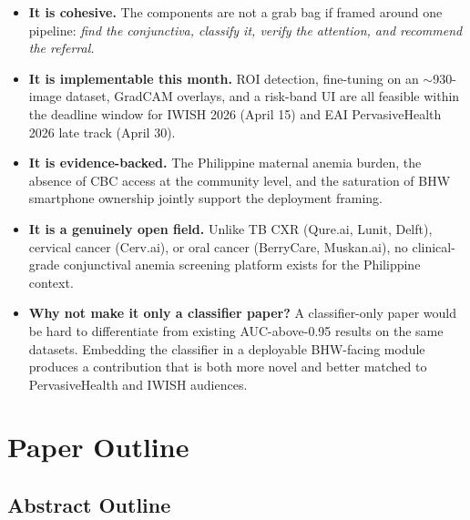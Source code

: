 \documentclass[11pt]{article}
\begin{document}
    \begin{itemize}[leftmargin=1.5em]
        \item \textbf{It is cohesive.} The components are not a grab bag if framed around one pipeline: \emph{find the conjunctiva, classify it, verify the attention, and recommend the referral.}
        \item \textbf{It is implementable this month.} ROI detection, fine-tuning on an $\sim$930-image dataset, GradCAM overlays, and a risk-band UI are all feasible within the deadline window for IWISH 2026 (April 15) and EAI PervasiveHealth 2026 late track (April 30).
        \item \textbf{It is evidence-backed.} The Philippine maternal anemia burden, the absence of CBC access at the community level, and the saturation of BHW smartphone ownership jointly support the deployment framing.
        \item \textbf{It is a genuinely open field.} Unlike TB CXR (Qure.ai, Lunit, Delft), cervical cancer (Cerv.ai), or oral cancer (BerryCare, Muskan.ai), no clinical-grade conjunctival anemia screening platform exists for the Philippine context.
        \item \textbf{Why not make it only a classifier paper?} A classifier-only paper would be hard to differentiate from existing AUC-above-0.95 results on the same datasets. Embedding the classifier in a deployable BHW-facing module produces a contribution that is both more novel and better matched to PervasiveHealth and IWISH audiences.
    \end{itemize}

    \section{Paper Outline}

    \subsection{Abstract Outline}
\end{document}
